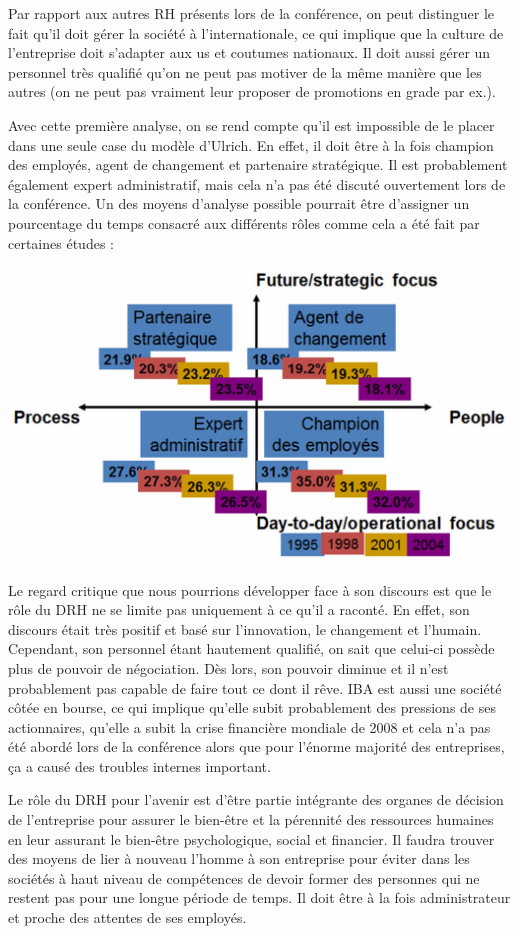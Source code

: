 \documentclass[12pt]{article}
\begin{document}
Par rapport aux autres RH présents lors de la conférence, on peut distinguer le fait qu'il doit gérer la société à l'internationale, ce qui implique que la culture de l'entreprise doit s'adapter aux us et coutumes nationaux. Il doit aussi gérer un personnel très qualifié qu'on ne peut pas motiver de la même manière que les autres (on ne peut pas vraiment leur proposer de promotions en grade par ex.).

Avec cette première analyse, on se rend compte qu'il est impossible de le placer dans une seule case du modèle d'Ulrich. En effet, il doit être à la fois champion des employés, agent de changement et partenaire stratégique. Il est probablement également expert administratif, mais cela n'a pas été discuté ouvertement lors de la conférence.
Un des moyens d'analyse possible pourrait être d'assigner un pourcentage du temps consacré aux différents rôles comme cela a été fait par certaines études :

\includegraphics[width=\linewidth]{ulrich_pourcentage.png}

Le regard critique que nous pourrions développer face à son discours est que le rôle du DRH ne se limite pas uniquement à ce qu'il a raconté. En effet, son discours était très positif et basé sur l'innovation, le changement et l'humain. Cependant, son personnel étant hautement qualifié, on sait que celui-ci possède plus de pouvoir de négociation. Dès lors, son pouvoir diminue et il n'est probablement pas capable de faire tout ce dont il rêve. IBA est aussi une société côtée en bourse, ce qui implique qu'elle subit probablement des pressions de ses actionnaires, qu'elle a subit la crise financière mondiale de 2008 et cela n'a pas été abordé lors de la conférence alors que pour l'énorme majorité des entreprises, ça a causé des troubles internes important.

Le rôle du DRH pour l'avenir est d'être partie intégrante des organes de décision de l'entreprise pour assurer le bien-être et la pérennité des ressources humaines en leur assurant le bien-être psychologique, social et financier. Il faudra trouver des moyens de lier à nouveau l'homme à son entreprise pour éviter dans les sociétés à haut niveau de compétences de devoir former des personnes qui ne restent pas pour une longue période de temps. Il doit être à la fois administrateur et proche des attentes de ses employés.
\end{document}
